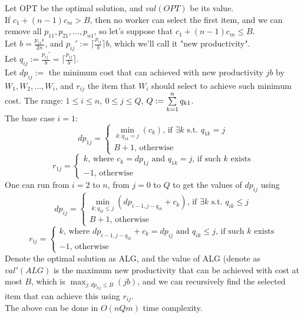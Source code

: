 \begin{pr}
Let OPT be the optimal solution, and $val(OPT)$ be its value.\\
If $c_1+(n-1)c_m>B$, then no worker can select the first item, and we can remove all $p_{11}, p_{21}, \dots, p_{n1}$, so let's suppose that $c_1+(n-1)c_m\leq B$.\\
Let $b=\frac{p_{11}\epsilon}{2n}$, and $p_{ij}':=\lceil\frac{p_{ij}}b\rceil b$, which we'll call it "new productivity".\\
Let $q_{ij}:=\frac{p_{ij}'}b=\lceil\frac{p_{ij}}b\rceil$.\\
Let $dp_{ij}:=$ the minimum cost that can achieved with new productivity $jb$ by $W_1, W_2, \dots, W_i$, and $r_{ij}$ the item that $W_i$ should select to achieve such minimum cost. The range: $1\leq i\leq n,\ 0\leq j\leq Q$, $Q:=\sum\limits_{k=1}^nq_{k1}$.\\
The base case $i=1$: $$dp_{1j}=\begin{cases}
\min_{k:q_{1k}=j}(c_k)\text{, if }\exists k\text{ s.t. }q_{1k}=j\\
B+1\text{, otherwise}
\end{cases}$$
$$r_{1j}=\begin{cases}
k\text{, where }c_k=dp_{1j}\text{ and }q_{1k}=j\text{, if such }k\text{ exists}\\
-1\text{, otherwise}
\end{cases}$$
One can run from $i=2$ to $n$, from $j=0$ to $Q$ to get the values of $dp_{ij}$ using
$$dp_{ij}=\begin{cases}
\min_{k:q_{ik}\leq j}(dp_{i-1, j-q_{ik}}+c_k)\text{, if }\exists k\text{ s.t. }q_{ik}\leq j\\
B+1\text{, otherwise}
\end{cases}$$
$$r_{ij}=\begin{cases}
k\text{, where }dp_{i-1, j-q_{ik}}+c_k=dp_{ij}\text{ and }q_{ik}\leq j\text{, if such }k\text{ exists}\\
-1\text{, otherwise}
\end{cases}$$
Denote the optimal solution as ALG, and the value of ALG (denote as $val'(ALG)$ is the maximum new productivity that can be achieved with cost at most $B$, which is $\max_{j:dp_{nj}\leq B}(jb)$, and we can recursively find the selected item that can achieve this using $r_{ij}$.\\
The above can be done in $O(nQm)$ time complexity.


\end{pr}
